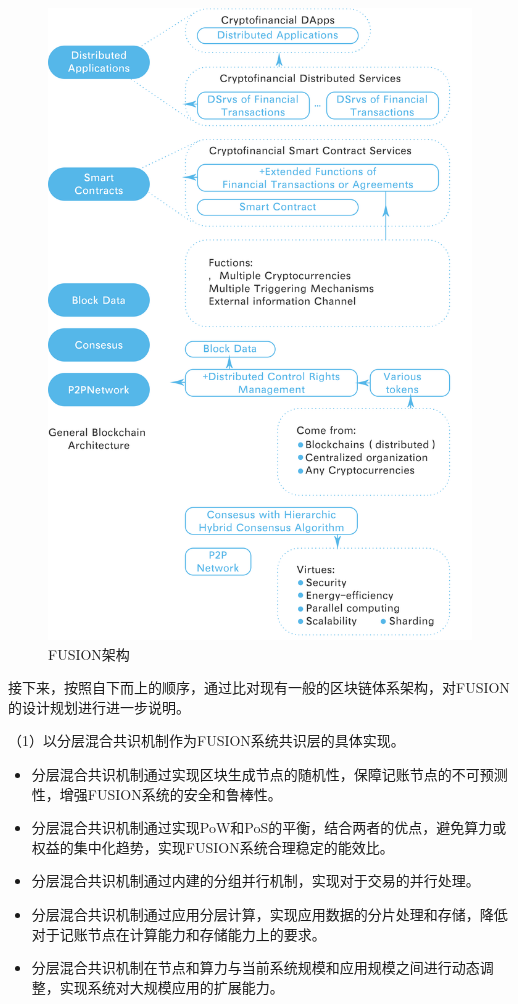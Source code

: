 \documentclass[a4paper,12pt]{article}
\begin{document}
\begin{figure}[htbp]
	\centering\includegraphics[width=\linewidth]{pic/Architecture.png}
	\caption{FUSION架构}\label{fig:Architecture}
\end{figure}

接下来，按照自下而上的顺序，通过比对现有一般的区块链体系架构，对FUSION的设计规划进行进一步说明。

（1）以分层混合共识机制作为FUSION系统共识层的具体实现。
\begin{itemize}[itemindent=1em]
	\item 分层混合共识机制通过实现区块生成节点的随机性，保障记账节点的不可预测性，增强FUSION系统的安全和鲁棒性。
	\item 分层混合共识机制通过实现PoW和PoS的平衡，结合两者的优点，避免算力或权益的集中化趋势，实现FUSION系统合理稳定的能效比。
	\item 分层混合共识机制通过内建的分组并行机制，实现对于交易的并行处理。
	\item 分层混合共识机制通过应用分层计算，实现应用数据的分片处理和存储，降低对于记账节点在计算能力和存储能力上的要求。
	\item 分层混合共识机制在节点和算力与当前系统规模和应用规模之间进行动态调整，实现系统对大规模应用的扩展能力。
\end{itemize}
\end{document}
